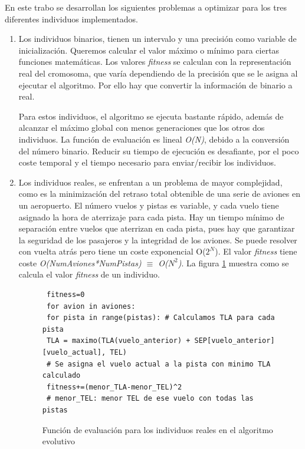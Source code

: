	\begin{flushleft}
		En este trabo se desarrollan los siguientes problemas a optimizar para los tres diferentes individuos implementados.
	\end{flushleft}
	\begin{enumerate}
		\item Los individuos binarios, tienen un intervalo y una precisión como variable de inicialización. Queremos calcular el valor máximo o mínimo para ciertas funciones matemáticas. Los valores \textit{fitness} se calculan con la representación real del cromosoma, que varía dependiendo de la precisión que se le asigna al ejecutar el algoritmo. Por ello hay que convertir la información de binario a real. 
		
		Para estos individuos, el algoritmo se ejecuta bastante rápido, además de alcanzar el máximo global con menos generaciones que los otros dos individuos. La función de evaluación es lineal \textit{O(N)}, debido a la conversión del número binario. Reducir su tiempo de ejecución es desafiante, por el poco coste temporal y el tiempo necesario para enviar/recibir los individuos.		
		\item Los individuos reales, se enfrentan a un problema de mayor complejidad, como es la minimización del retraso total obtenible de una serie de aviones en un aeropuerto. El número vuelos y pistas es variable, y cada vuelo tiene asignado la hora de aterrizaje para cada pista. Hay un tiempo mínimo de separación entre vuelos que aterrizan en cada pista, pues hay que garantizar la seguridad de los pasajeros y la integridad de los aviones. Se puede resolver con vuelta atrás pero tiene un coste exponencial O(\(2^{N}\)). El valor \textit{fitness} tiene coste \textit{O(NumAviones*NumPistas) $\equiv$ O(\(N^{2}\))}. La figura \ref{fig:pev_funcion_ev_2} muestra como se calcula el valor \textit{fitness} de un individuo.
		
		\begin{figure}[!h]
		
		
			\begin{lstlisting}
 fitness=0
 for avion in aviones:
 for pista in range(pistas): # Calculamos TLA para cada pista
 TLA = maximo(TLA(vuelo_anterior) + SEP[vuelo_anterior][vuelo_actual], TEL)
 # Se asigna el vuelo actual a la pista con minimo TLA calculado
 fitness+=(menor_TLA-menor_TEL)^2
 # menor_TEL: menor TEL de ese vuelo con todas las pistas		
			\end{lstlisting}
			\caption{Función de evaluación para los individuos reales en el algoritmo evolutivo}
			\label{fig:pev_funcion_ev_2}
		\end{figure}
		

\end{enumerate}
